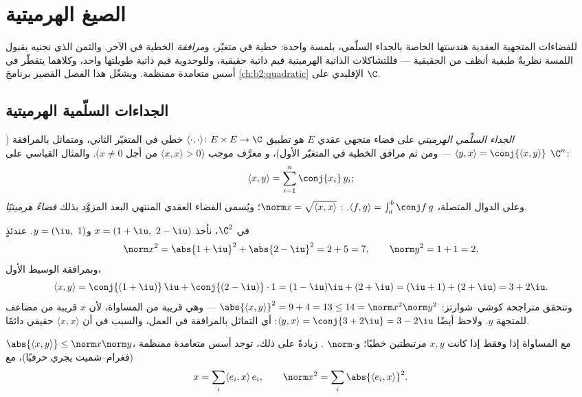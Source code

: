 \chapter{الصيغ الهرميتية}\label{ch:b2:hermitian}

للفضاءات المتجهية العقدية هندستها الخاصة بالجداء السلّمي، بلمسة
واحدة: خطية في متغيّر، و\emph{مرافقة} الخطية في
الآخر. والثمن الذي نجنيه بقبول اللمسة نظريةٌ طيفية
أنظف من الحقيقية --- فللتشاكلات الذاتية الهرميتية قيم ذاتية
حقيقية، وللوحدوية قيم ذاتية طويلتها واحد، وكلاهما
يتقطّر في أسس متعامدة ممنظمة. ويشغّل هذا الفصل القصير
برنامجَ \cref{ch:b2:quadratic} الإقليدي على $\C$.

\section{الجداءات السلّمية الهرميتية}

\begin{definition}\label{def:b2:hermitian:def}
\emph{الجداء السلّمي الهرميتي} على
فضاء متجهي عقدي $E$ هو تطبيق $\langle\cdot,\cdot\rangle
\colon E \times E \to \C$ خطي في المتغيّر الثاني،
ومتماثل بالمرافقة ($\langle y, x\rangle = \conj{\langle x,
y\rangle}$ --- ومن ثم مرافق الخطية في المتغيّر الأول)، و
معرَّف موجب ($\langle x, x\rangle > 0$ من أجل $x \neq 0$). والمثال
القياسي على $\C^n$:
\[
\langle x, y \rangle = \sum_{i=1}^{n} \conj{x_i}\, y_i ;
\]
وعلى الدوال المتصلة، $\langle f, g\rangle = \int_a^b \conj
f\,g$. : $\norm x = \sqrt{\langle x,x\rangle}$؛ ويُسمى الفضاء
العقدي المنتهي البعد المزوَّد بذلك \emph{فضاءً
هرميتيًا}.
\end{definition}

\begin{example}\label{ex:b2:hermitian:firstcomp}
في $\C^2$، نأخذ $x = (1+\iu,\ 2-\iu)$ و$y = (\iu,\ 1)$.
عندئذٍ
\[
\norm x^2 = \abs{1+\iu}^2 + \abs{2-\iu}^2 = 2 + 5 = 7,
\qquad
\norm y^2 = 1 + 1 = 2,
\]
وبمرافقة الوسيط الأول،
\[
\langle x, y\rangle
= \conj{(1+\iu)}\,\iu + \conj{(2-\iu)}\cdot1
= (1-\iu)\iu + (2+\iu)
= (\iu + 1) + (2 + \iu) = 3 + 2\iu .
\]
وتتحقق متراجحة كوشي--شوارتز: $\abs{\langle x, y\rangle}^2 = 9 +
4 = 13 \leq 14 = \norm x^2\norm y^2$ --- وهي قريبة من المساواة،
لأن $x$ قريبة من مضاعف للمتجهة $y$. ولاحظ أيضًا
$\langle y, x\rangle = \conj{3 + 2\iu} = 3 - 2\iu$:
أي التماثل بالمرافقة في العمل، والسبب في أن $\langle x,
x\rangle$ حقيقي دائمًا.
\end{example}

\begin{theorem}\label{thm:b2:hermitian:cs}
$\abs{\langle x, y\rangle} \leq \norm x \norm y$، مع المساواة إذا وفقط إذا كانت
$x, y$ مرتبطتين خطيًا؛ و$\norm\cdot$ . زيادةً على ذلك،
توجد أسس متعامدة ممنظمة (فغرام--شميت يجري حرفيًا)، مع
\[
x = \sum_i \langle e_i, x\rangle\, e_i,
\qquad
\norm x^2 = \sum_i \abs{\langle e_i, x\rangle}^2 .
\]
\end{theorem}

